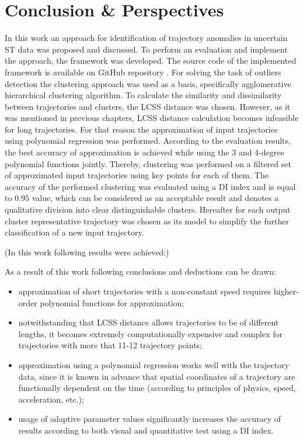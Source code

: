 \chapter{Conclusion \& Perspectives}
\label{ch:Conclusion & Perspectives}

In this work an approach for identification of trajectory anomalies in uncertain ST data was proposed and discussed. To perform an evaluation and implement the approach, the framework was developed. The source code of the implemented framework is available on GitHub repository \cite{online:mt_anomalies}. For solving the task of outliers detection the clustering approach was used as a basis, specifically agglomerative hierarchical clustering algorithm. To calculate the similarity and dissimilarity between trajectories and clusters, the LCSS distance was chosen. However, as it was mentioned in previous chapters, LCSS distance calculation becomes infeasible for long trajectories. For that reason the approximation of input trajectories using polynomial regression was performed. According to the evaluation results, the best accuracy of approximation is achieved while using the 3 and 4-degree polynomial functions jointly. Thereby, clustering was performed on a filtered set of approximated input trajectories using key points for each of them. The accuracy of the performed clustering was evaluated using a DI index and is equal to $0.95$ value, which can be considered as an acceptable result and denotes a qualitative division into clear distinguishable clusters. Hereafter for each output cluster representative trajectory was chosen as its model to simplify the further classification of a new input trajectory.

(In this work following results were achieved:)

As a result of this work following conclusions and deductions can be drawn:

\begin{itemize}
	\setlength\itemsep{0em}	
	\item approximation of short trajectories with a non-constant speed requires higher-order polynomial functions for approximation;
	\item notwithstanding that LCSS distance allows trajectories to be of different lengths, it becomes extremely computationally expensive and complex for trajectories with more that 11-12 trajectory points;
	\item approximation using a polynomial regression works well with the trajectory data, since it is known in advance that spatial coordinates of a trajectory are functionally dependent on the time (according to principles of physics, speed, acceleration, etc.);
	\item usage of adaptive parameter values significantly increases the accuracy of results according to both visual and quantitative test using a DI index.
\end{itemize}

